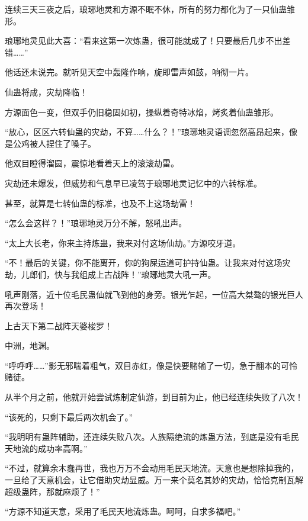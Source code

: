 \begin{this_body}
连续三天三夜之后，琅琊地灵和方源不眠不休，所有的努力都化为了一只仙蛊雏形。

琅琊地灵见此大喜：“看来这第一次炼蛊，很可能就成了！只要最后几步不出差错……”

他话还未说完。就听见天空中轰隆作响，旋即雷声如鼓，响彻一片。

仙蛊将成，灾劫降临！

方源面色一变，但双手仍旧稳固如初，操纵着奇特冰焰，烤炙着仙蛊雏形。

“放心，区区六转仙蛊的灾劫，不算……什么？！”琅琊地灵语调忽然高昂起来，像是公鸡被人捏住了嗓子。

他双目瞪得溜圆，震惊地看着天上的滚滚劫雷。

灾劫还未爆发，但威势和气息早已凌驾于琅琊地灵记忆中的六转标准。

甚至，就算是七转仙蛊的标准，也及不上这场劫雷！

“怎么会这样？！”琅琊地灵万分不解，怒吼出声。

“太上大长老，你来主持炼蛊，我来对付这场仙劫。”方源咬牙道。

“不！最后的关键，你不能离开，你的狗屎运道可护持仙蛊。让我来对付这场灾劫，儿郎们，快与我组成上古战阵！”琅琊地灵大吼一声。

吼声刚落，近十位毛民蛊仙就飞到他的身旁。银光乍起，一位高大桀骜的银光巨人再次登场！

上古天下第二战阵天婆梭罗！

中洲，地渊。

“呼呼呼……”影无邪喘着粗气，双目赤红，像是快要赌输了一切，急于翻本的可怜赌徒。

从半个月之前，他就开始尝试炼制定仙游，到目前为止，他已经连续失败了八次！

“该死的，只剩下最后两次机会了。”

“我明明有蛊阵辅助，还连续失败八次。人族隔绝流的炼蛊方法，到底是没有毛民天地流的成功率高啊。”

“不过，就算余木蠢再世，我也万万不会动用毛民天地流。天意也是想除掉我的，一旦给了天意机会，让它借助灾劫显威。万一来个莫名其妙的灾劫，恰恰克制瓦解超级蛊阵，那就麻烦了！”

“方源不知道天意，采用了毛民天地流炼蛊。呵呵，自求多福吧。”

\end{this_body}

